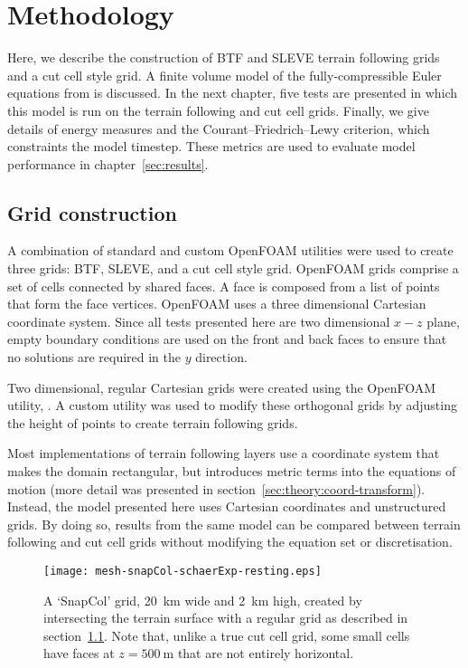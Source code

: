 \chapter{Methodology}
\label{sec:method}

Here, we describe the construction of BTF and SLEVE terrain following grids and a cut cell style grid.  A finite volume model of the fully-compressible Euler equations from \textcite{weller-shahrokhi2014} is discussed.  In the next chapter, five tests are presented in which this model is run on the terrain following and cut cell grids.  Finally, we give details of energy measures and the Courant--Friedrich--Lewy criterion, which constraints the model timestep.  These metrics are used to evaluate model performance in chapter~\ref{sec:results}.

\section{Grid construction}
\label{sec:method:grid}

A combination of standard and custom OpenFOAM utilities were used to create three grids: BTF, SLEVE, and a cut cell style grid.  OpenFOAM grids comprise a set of cells connected by shared faces.  A face is composed from a list of points that form the face vertices.
OpenFOAM uses a three dimensional Cartesian coordinate system.  Since all tests presented here are two dimensional $x-z$ plane, empty boundary conditions are used on the front and back faces to ensure that no solutions are required in the $y$ direction.

Two dimensional, regular Cartesian grids were created using the OpenFOAM utility, .  A custom utility was used to modify these orthogonal grids by adjusting the height of points to create terrain following grids.

Most implementations of terrain following layers use a coordinate system that makes the domain rectangular, but introduces metric terms into the equations of motion (more detail was presented in section~\ref{sec:theory:coord-transform}).  Instead, the model presented here uses Cartesian coordinates and unstructured grids.  By doing so, results from the same model can be compared between terrain following and cut cell grids without modifying the equation set or discretisation.

\begin{figure}
\centerfloat
\texttt{[image: mesh-snapCol-schaerExp-resting.eps]}
\caption{A `SnapCol' grid, \SI{20}{\kilo\meter} wide and \SI{2}{\kilo\meter} high, created by intersecting the terrain surface with a regular grid as described in section~\ref{sec:method:grid}.  Note that, unlike a true cut cell grid, some small cells have faces at $z = \SI{500}{\meter}$ that are not entirely horizontal.}
\label{fig:method:cut-cell}
\end{figure}

